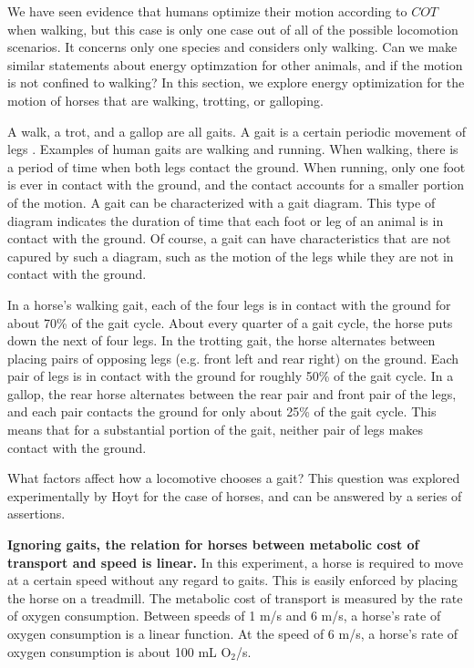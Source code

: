 We have seen evidence that humans optimize their motion according to $COT$ when walking, but this case is only one case out of all of the possible locomotion scenarios. It concerns only one species and considers only walking. Can we make similar statements about energy optimzation for other animals, and if the motion is not confined to walking? In this section, we explore energy optimization for the motion of horses that are walking, trotting, or galloping.

A walk, a trot, and a gallop are all gaits. A gait is a certain periodic movement of legs \cite{hildebrand89}. Examples of human gaits are walking and running. When walking, there is a period of time when both legs contact the ground. When running, only one foot is ever in contact with the ground, and the contact accounts for a smaller portion of the motion. A gait can be characterized with a gait diagram. This type of diagram indicates the duration of time that each foot or leg of an animal is in contact with the ground. Of course, a gait can have characteristics that are not capured by such a diagram, such as the motion of the legs while they are not in contact with the ground.

In a horse's walking gait, each of the four legs is in contact with the ground for about 70\% of the gait cycle. About every quarter of a gait cycle, the horse puts down the next of four legs. In the trotting gait, the horse alternates between placing pairs of opposing legs (e.g. front left and rear right) on the ground. Each pair of legs is in contact with the ground for roughly 50\% of the gait cycle. In a gallop, the rear horse alternates between the rear pair and front pair of the legs, and each pair contacts the ground for only about 25\% of the gait cycle. This means that for a substantial portion of the gait, neither pair of legs makes contact with the ground.

What factors affect how a locomotive chooses a gait? This question was explored experimentally by Hoyt \cite{hoyt81} for the case of horses, and can be answered by a series of assertions.

\textbf{Ignoring gaits, the relation for horses between metabolic cost of transport and speed is linear.} In this experiment, a horse is required to move at a certain speed without any regard to gaits. This is easily enforced by placing the horse on a treadmill. The metabolic cost of transport is measured by the rate of oxygen consumption. Between speeds of 1 m/s and 6 m/s, a horse's rate of oxygen consumption is a linear function. At the speed of 6 m/s, a horse's rate of oxygen consumption is about 100 mL O$_2$/s.

